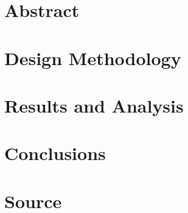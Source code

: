 \documentclass[11pt]{article}
\begin{document}


\section{Abstract}
\label{sec:abstract}





\section{Design Methodology}
\label{sec:design_methodology}




\section{Results and Analysis}
\label{sec:results_and_analysis}




\section{Conclusions}
\label{sec:conclusions}




\section{Source}
\label{sec:source}



\end{document}
